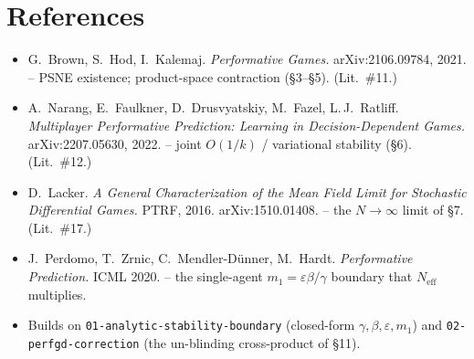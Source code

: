 \documentclass[11pt]{article}
\newcommand{\eps}{\varepsilon}
\newcommand{\code}[1]{\texttt{#1}}
\newcommand{\Neff}{N_{\mathrm{eff}}}
\begin{document}
\section*{References}
\begin{itemize}[leftmargin=1.4em]
  \item G.\ Brown, S.\ Hod, I.\ Kalemaj. \emph{Performative Games.} arXiv:2106.09784,
  2021. -- PSNE existence; product-space contraction (\S3--\S5). (Lit.\ \#11.)
  \item A.\ Narang, E.\ Faulkner, D.\ Drusvyatskiy, M.\ Fazel, L.\,J.\ Ratliff.
  \emph{Multiplayer Performative Prediction: Learning in Decision-Dependent Games.}
  arXiv:2207.05630, 2022. -- joint $O(1/k)$ / variational stability (\S6). (Lit.\ \#12.)
  \item D.\ Lacker. \emph{A General Characterization of the Mean Field Limit for
  Stochastic Differential Games.} PTRF, 2016. arXiv:1510.01408. -- the $N\to\infty$
  limit of \S7. (Lit.\ \#17.)
  \item J.\ Perdomo, T.\ Zrnic, C.\ Mendler-D\"unner, M.\ Hardt. \emph{Performative
  Prediction.} ICML 2020. -- the single-agent $m_1=\eps\beta/\gamma$ boundary that
  $\Neff$ multiplies.
  \item Builds on \code{01-analytic-stability-boundary} (closed-form $\gamma,\beta,\eps,m_1$)
  and \code{02-perfgd-correction} (the un-blinding cross-product of \S11).
\end{itemize}
\end{document}

